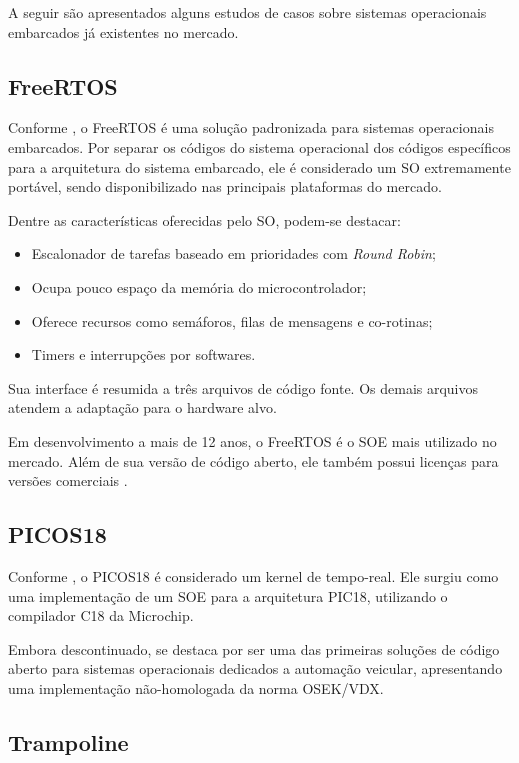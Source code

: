 A seguir são apresentados alguns estudos de casos sobre sistemas operacionais embarcados já existentes no mercado.

\subsection{FreeRTOS}

Conforme , o FreeRTOS é uma solução padronizada para sistemas operacionais embarcados. Por separar os códigos do sistema operacional dos códigos específicos para a arquitetura do sistema embarcado, ele é considerado um SO extremamente portável, sendo disponibilizado nas principais plataformas do mercado.

Dentre as características oferecidas pelo SO, podem-se destacar:
\begin{itemize}
	\item Escalonador de tarefas baseado em prioridades com \emph{Round Robin};
	\item Ocupa pouco espaço da memória do microcontrolador;
	\item Oferece recursos como semáforos, filas de mensagens e co-rotinas;
	\item Timers e interrupções por softwares.
\end{itemize}

Sua interface é resumida a três arquivos de código fonte. Os demais arquivos atendem a adaptação para o hardware alvo.

Em desenvolvimento a mais de 12 anos, o FreeRTOS é o SOE mais utilizado no mercado. Além de sua versão de código aberto, ele também possui licenças para versões comerciais \cite{FreeRTOS:MarketShare}.

\subsection{PICOS18}

Conforme , o PICOS18 é considerado um kernel de tempo-real. Ele surgiu como uma implementação de um SOE para a arquitetura PIC18, utilizando o compilador C18 da Microchip\textsuperscript{\textregistered}.

Embora descontinuado, se destaca por ser uma das primeiras soluções de código aberto para sistemas operacionais dedicados a automação veicular, apresentando uma implementação não-homologada da norma OSEK/VDX.

\subsection{Trampoline}


